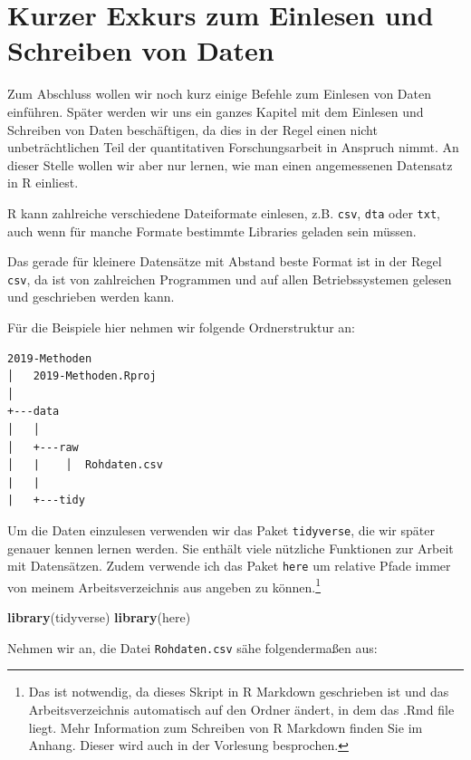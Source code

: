 \documentclass[]{tufte-book}
\newenvironment{Shaded}{}{}
\newcommand{\KeywordTok}[1]{\textcolor[rgb]{0.00,0.44,0.13}{\textbf{#1}}}
\newcommand{\NormalTok}[1]{#1}
\begin{document}
\section{Kurzer Exkurs zum Einlesen und Schreiben von
Daten}\label{kurzer-exkurs-zum-einlesen-und-schreiben-von-daten}

Zum Abschluss wollen wir noch kurz einige Befehle zum Einlesen von Daten
einführen. Später werden wir uns ein ganzes Kapitel mit dem Einlesen und
Schreiben von Daten beschäftigen, da dies in der Regel einen nicht
unbeträchtlichen Teil der quantitativen Forschungsarbeit in Anspruch
nimmt. An dieser Stelle wollen wir aber nur lernen, wie man einen
angemessenen Datensatz in R einliest.

R kann zahlreiche verschiedene Dateiformate einlesen, z.B. \texttt{csv},
\texttt{dta} oder \texttt{txt}, auch wenn für manche Formate bestimmte
Libraries geladen sein müssen.

Das gerade für kleinere Datensätze mit Abstand beste Format ist in der
Regel \texttt{csv}, da ist von zahlreichen Programmen und auf allen
Betriebssystemen gelesen und geschrieben werden kann.

Für die Beispiele hier nehmen wir folgende Ordnerstruktur an:

\begin{verbatim}
2019-Methoden
│   2019-Methoden.Rproj
│
+---data
│   │
│   +---raw
│   |    │  Rohdaten.csv
|   |
|   +---tidy
\end{verbatim}

Um die Daten einzulesen verwenden wir das Paket \texttt{tidyverse}, die
wir später genauer kennen lernen werden. Sie enthält viele nützliche
Funktionen zur Arbeit mit Datensätzen. Zudem verwende ich das Paket
\texttt{here} um relative Pfade immer von meinem Arbeitsverzeichnis aus
angeben zu können.\footnote{Das ist notwendig, da dieses Skript in R
  Markdown geschrieben ist und das Arbeitsverzeichnis automatisch auf
  den Ordner ändert, in dem das .Rmd file liegt. Mehr Information zum
  Schreiben von R Markdown finden Sie im Anhang. Dieser wird auch in der
  Vorlesung besprochen.}

\begin{Shaded}
\begin{Highlighting}[]
\KeywordTok{library}\NormalTok{(tidyverse)}
\KeywordTok{library}\NormalTok{(here)}
\end{Highlighting}
\end{Shaded}

Nehmen wir an, die Datei \texttt{Rohdaten.csv} sähe folgendermaßen aus:
\end{document}
